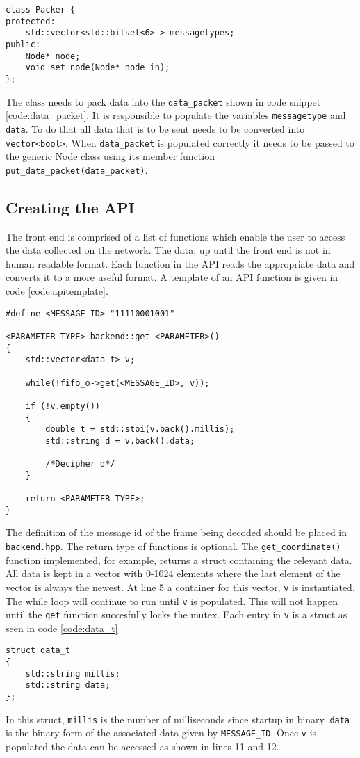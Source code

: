 \begin{lstlisting}[caption=Packer class.,label=code:packer]
class Packer {
protected: 
	std::vector<std::bitset<6> > messagetypes;
public:
	Node* node;
	void set_node(Node* node_in);
};
\end{lstlisting}

The class needs to pack data into the \texttt{data\_packet} shown in code snippet \ref{code:data_packet}.
It is responsible to populate the variables \texttt{messagetype} and \texttt{data}.
To do that all data that is to be sent needs to be converted into \texttt{vector<bool>}.
When \texttt{data\_packet} is populated correctly it needs to be passed to the generic Node class using its member function \texttt{put\_data\_packet(data\_packet)}.

\subsection{Creating the API}
The front end is comprised of a list of functions which enable the user to access the data collected on the network.
The data, up until the front end is not in human readable format.
Each function in the API reads the appropriate data and converts it to a more useful format.
A template of an API function is given in code \ref{code:apitemplate}.

\begin{lstlisting}[caption=Function template for accesing data,label=code:apitemplate]
#define <MESSAGE_ID> "11110001001"

<PARAMETER_TYPE> backend::get_<PARAMETER>()
{
	std::vector<data_t> v;

	while(!fifo_o->get(<MESSAGE_ID>, v));

	if (!v.empty())
	{
		double t = std::stoi(v.back().millis);
		std::string d = v.back().data;

		/*Decipher d*/		
	}

	return <PARAMETER_TYPE>;
}
\end{lstlisting}

The definition of the message id of the frame being decoded should be placed in \texttt{backend.hpp}.
The return type of functions is optional.
The \texttt{get\_coordinate()} function implemented, for example, returns a struct containing the relevant data.
All data is kept in a vector with 0-1024 elements where the last element of the vector is always the newest.
At line 5 a container for this vector, \texttt{v} is instantiated.
The while loop will continue to run until \texttt{v} is populated.
This will not happen until the \texttt{get} function succesfully locks the mutex.
Each entry in \texttt{v} is a struct as seen in code \ref{code:data_t}

\begin{lstlisting}[caption=Struct used to store each datapoint,label=code:data_t]
struct data_t
{
	std::string millis;
	std::string data;
};
\end{lstlisting}

In this struct, \texttt{millis} is the number of milliseconds since startup in binary.
\texttt{data} is the binary form of the associated data given by \texttt{MESSAGE\_ID}.
Once \texttt{v} is populated the data can be accessed as shown in lines 11 and 12.